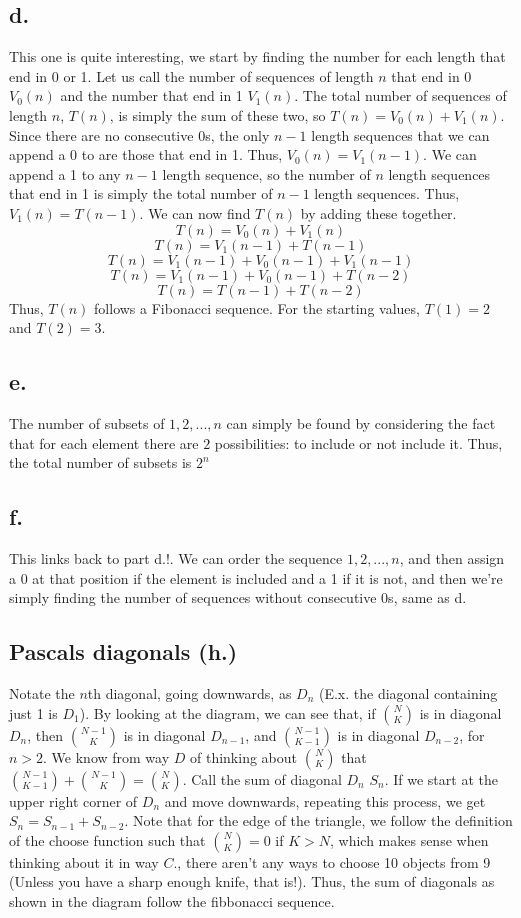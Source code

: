 \documentclass{article}
\begin{document}
\subsection*{d.}
This one is quite interesting, we start by finding the number for each length that end in 0 or 1. Let us call the number of sequences of length $n$ that end in 0 $V_0(n)$ and the number that end in 1 $V_1(n)$. The total number of sequences of length $n$, $T(n)$, is simply the sum of these two, so $T(n)=V_0(n)+V_1(n)$. Since there are no consecutive 0s, the only $n-1$ length sequences that we can append a 0 to are those that end in 1. Thus, $V_0(n)=V_1(n-1)$. We can append a 1 to any $n-1$ length sequence, so the number of $n$ length sequences that end in 1 is simply the total number of $n-1$ length sequences. Thus, $V_1(n)=T(n-1)$. We can now find $T(n)$ by adding these together. 
$$T(n)=V_0(n)+V_1(n)$$
$$T(n)=V_1(n-1)+T(n-1)$$
$$T(n)=V_1(n-1)+V_0(n-1)+V_1(n-1)$$
$$T(n)=V_1(n-1)+V_0(n-1)+T(n-2)$$
$$T(n)=T(n-1)+T(n-2)$$
Thus, $T(n)$ follows a Fibonacci sequence. For the starting values, $T(1)=2$ and $T(2)=3$.
\subsection*{e.}
The number of subsets of ${1, 2, ..., n}$ can simply be found by considering the fact that for each element there are $2$ possibilities: to include or not include it. Thus, the total number of subsets is $2^n$
\subsection*{f.}
This links back to part d.!. We can order the sequence ${1, 2, ..., n}$, and then assign a 0 at that position if the element is included and a 1 if it is not, and then we're simply finding the number of sequences without consecutive 0s, same as d.
\subsection*{Pascals diagonals (h.)}
Notate the $n$th diagonal, going downwards, as $D_n$ (E.x. the diagonal containing just 1 is $D_1$). By looking at the diagram, we can see that, if $N \choose K$ is in diagonal $D_n$, then $N-1 \choose K$ is in diagonal $D_{n-1}$, and $N-1 \choose K-1$ is in diagonal $D_{n-2}$, for $n>2$. We know from way $D$ of thinking about $N \choose K$ that ${N-1 \choose K-1}+{N-1 \choose K}={N \choose K}$. Call the sum of diagonal $D_n$  $S_n$. If we start at the upper right corner of $D_n$ and move downwards, repeating this process, we get $S_{n}=S_{n-1}+S_{n-2}$. Note that for the edge of the triangle, we follow the definition of the choose function such that ${N \choose K}=0$ if $K>N$, which makes sense when thinking about it in way $C.$, there aren't any ways to choose 10 objects from 9 (Unless you have a sharp enough knife, that is!). Thus, the sum of diagonals as shown in the diagram follow the fibbonacci sequence.
\pagebreak
\end{document}
